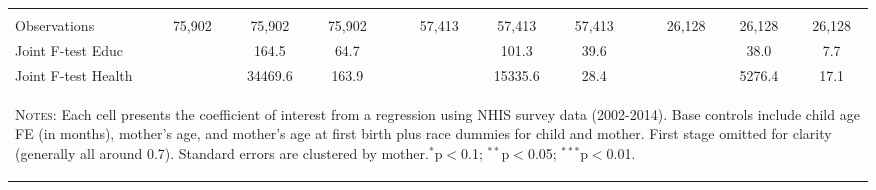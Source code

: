 \begin{table}[htpb!]
\begin{center}
{\begin{tabular}{lcccp{2mm}cccp{2mm}ccc}
\begin{footnotesize}\end{footnotesize}&\begin{footnotesize}\end{footnotesize}&\begin{footnotesize}\end{footnotesize}&\begin{footnotesize}\end{footnotesize}&\begin{footnotesize}\end{footnotesize}&\begin{footnotesize}\end{footnotesize}&\begin{footnotesize}\end{footnotesize}&\begin{footnotesize}\end{footnotesize}&\begin{footnotesize}\end{footnotesize}&\begin{footnotesize}\end{footnotesize}&\begin{footnotesize}\end{footnotesize}&\begin{footnotesize}\end{footnotesize}\\ 
Observations & 75,902 &	75,902 &	75,902 &&	57,413 &	57,413 &	57,413 &&	26,128 &	26,128 &	26,128 \\
Joint F-test Educ &&164.5&64.7&&&101.3&39.6&&&38.0&7.7\\
Joint F-test Health &&34469.6&163.9&&&15335.6&28.4&&&5276.4&17.1\\
\midrule\multicolumn{12}{p{20.6cm}}{\begin{footnotesize}\textsc{Notes:}  
Each cell presents the coefficient of interest from a regression using NHIS survey data (2002-2014). Base controls include child age FE (in months), mother's age, and mother's age at first birth 
plus race dummies for child and mother.  First stage omitted for clarity (generally all around 0.7).  Standard errors are clustered by mother.$^{*}$p$<$0.1; $^{**}$p$<$0.05; $^{***}$p$<$0.01. 
\end{footnotesize}} \\ \bottomrule 
\end{tabular}}\end{center}\end{table}
